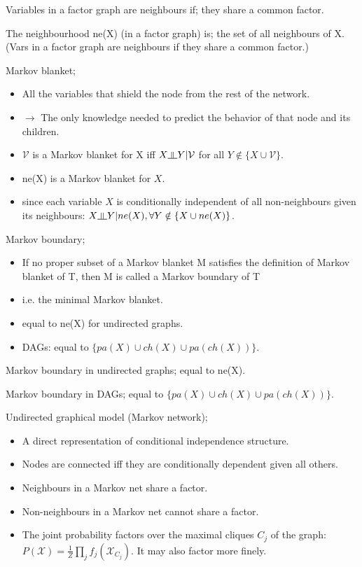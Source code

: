 \documentclass{article}
\newcommand{\indep}{\rotatebox[origin=c]{90}{$\models$}}
\begin{document}
Variables in a factor graph are neighbours if; they share a common factor. 

The neighbourhood ne(X) (in a factor graph) is;  the set of all neighbours of X. (Vars in a factor graph are neighbours if they share a common factor.)

Markov blanket; \begin{itemize}
	\item All the variables that shield the node from the rest of the network. 
	\item $\to$ The only knowledge needed to predict the behavior of that node and its children.
	\item $\mathcal{V}$ is a Markov blanket for X iff $X \indep Y |\mathcal{V}$ for all $Y \notin \{X\cup \mathcal{V} \}$.
	\item ne(X) is  a Markov blanket for $X$.
	\item since each variable $X$ is conditionally independent of all non-neighbours given its neighbours: $X\indep Y|ne(X), \forall Y \notin \{X\cup ne(X) \}$.
\end{itemize}

Markov boundary; \begin{itemize}
	\item If no proper subset of a Markov blanket M satisfies the definition of Markov blanket of T, then M is called a Markov boundary of T
	\item i.e. the minimal Markov blanket.
	\item equal to ne(X) for undirected graphs. 
	\item DAGs: equal to $\{pa(X)\cup ch(X) \cup pa(ch(X)) \}$.
\end{itemize}

Markov boundary in undirected graphs; equal to ne(X).

Markov boundary in DAGs; equal to $\{pa(X)\cup ch(X) \cup pa(ch(X)) \}$.

Undirected graphical model (Markov network); \begin{itemize}
	\item A direct representation of conditional independence structure.
	\item Nodes are connected iff they are conditionally dependent given all others.
	\item Neighbours in a Markov net share a factor.
	\item Non-neighbours in a Markov net cannot share a factor.
	\item The joint probability factors over the maximal cliques $C_j$ of the graph: $P(\mathcal{X})=\frac{1}{Z}\prod_j f_j(\mathcal{X}_{C_j})$. It may also factor more finely.
\end{itemize}
\end{document}
